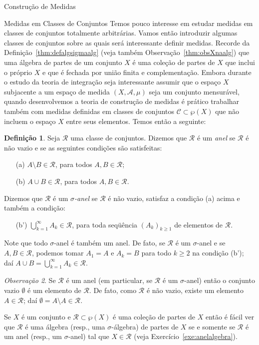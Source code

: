 \documentclass[oneside,final,11pt]{amsbook}
\theoremstyle{remark}\newtheorem{exercise}{Exercício}[chapter]
\theoremstyle{remark}\newtheorem{*exercise}[exercise]{\hbox to 0pt{\hskip 0pt minus 1fil*}Exercício}
\theoremstyle{definition}\newtheorem{exdefin}{Definição}[chapter]
\theoremstyle{plain}\newtheorem{teo}{Teorema}[section]
\theoremstyle{plain}\newtheorem{lem}[teo]{Lema}
\theoremstyle{plain}\newtheorem{prop}[teo]{Proposição}
\theoremstyle{plain}\newtheorem{cor}[teo]{Corolário}
\theoremstyle{definition}\newtheorem{defin}[teo]{Definição}
\theoremstyle{remark}\newtheorem{rem}[teo]{Observação}
\theoremstyle{definition}\newtheorem{notation}[teo]{Notação}
\theoremstyle{definition}\newtheorem{convention}[teo]{Convenção}
\theoremstyle{definition}\newtheorem{example}[teo]{Exemplo}
\numberwithin{section}{chapter}
\numberwithin{equation}{section}
\begin{document}
\begin{chapter}{Construção de Medidas}
\begin{section}{Medidas em Classes de Conjuntos}
Temos pouco interesse em estudar medidas em classes de conjuntos totalmente arbitrárias. Vamos então introduzir
algumas classes de conjuntos sobre as quais será interessante definir medidas. Recorde da Definição~\ref{thm:defalgsigmaalg}
(veja também Observação~\ref{thm:obsXnaalg}) que uma álgebra de partes de um conjunto $X$ é uma coleção de partes de $X$ que
inclui o próprio $X$ e que é fechada por união finita e complementação. Embora durante o estudo da teoria de integração
seja interessante assumir que o espaço $X$ subjacente a um espaço de medida $(X,\mathcal A,\mu)$ seja um conjunto
mensurável, quando desenvolvemos a teoria de construção de medidas é prático trabalhar também com medidas definidas
em classes de conjuntos $\mathcal C\subset\wp(X)$ que não incluem o espaço $X$ entre seus elementos.
Temos então a seguinte:
\begin{defin}
Seja $\mathcal R$ uma classe de conjuntos. Dizemos que $\mathcal R$ é um {\em anel\/} se $\mathcal R$ é não vazio
e se as seguintes condições são satisfeitas:
\begin{itemize}
\item[(a)] $A\setminus B\in\mathcal R$, para todos $A,B\in\mathcal R$;
\item[(b)] $A\cup B\in\mathcal R$, para todos $A,B\in\mathcal R$.
\end{itemize}
Dizemos que $\mathcal R$ é um {\em $\sigma$-anel\/} se $\mathcal R$ é não vazio,
satisfaz a condição (a) acima e também a condição:
\begin{itemize}
\item[(b')] $\bigcup_{k=1}^\infty A_k\in\mathcal R$, para toda seqüência $(A_k)_{k\ge1}$ de elementos
de $\mathcal R$.
\end{itemize}
\end{defin}
Note que todo $\sigma$-anel é também um anel. De fato, se $\mathcal R$ é um $\sigma$-anel
e se $A,B\in\mathcal R$, podemos tomar $A_1=A$ e $A_k=B$ para todo $k\ge2$ na condição (b');
daí $A\cup B=\bigcup_{k=1}^\infty A_k\in\mathcal R$.

\begin{rem}
Se $\mathcal R$ é um anel (em particular, se $\mathcal R$ é um $\sigma$-anel) então o conjunto vazio $\emptyset$ é
um elemento de $\mathcal R$. De fato, como $\mathcal R$ é não vazio, existe um elemento $A\in\mathcal R$;
daí $\emptyset=A\setminus A\in\mathcal R$.
\end{rem}

Se $X$ é um conjunto e $\mathcal R\subset\wp(X)$ é uma coleção de partes de $X$ então é fácil ver que
$\mathcal R$ é uma álgebra (resp., uma $\sigma$-álgebra) de partes de $X$ se e somente se $\mathcal R$ é um anel
(resp., um $\sigma$-anel) tal que $X\in\mathcal R$ (veja Exercício~\ref{exe:anelalgebra}).


\end{section}
\end{chapter}
\end{document}
